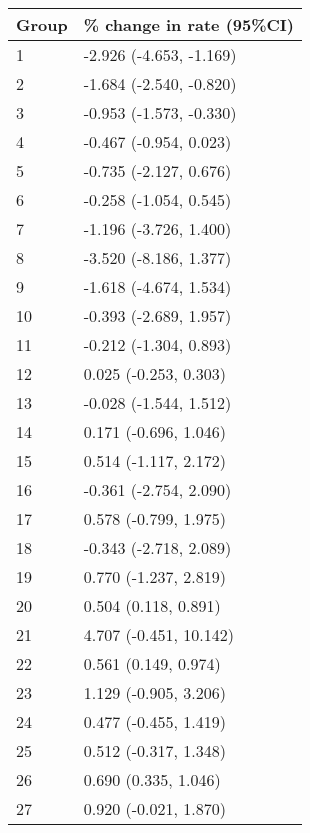 \begin{tabular}{ll}
  \hline
Group & \% change in rate (95\%CI) \\ 
  \hline
   1 & -2.926 (-4.653, -1.169) \\ 
     2 & -1.684 (-2.540, -0.820) \\ 
     3 & -0.953 (-1.573, -0.330) \\ 
     4 & -0.467 (-0.954, 0.023) \\ 
     5 & -0.735 (-2.127, 0.676) \\ 
     6 & -0.258 (-1.054, 0.545) \\ 
     7 & -1.196 (-3.726, 1.400) \\ 
     8 & -3.520 (-8.186, 1.377) \\ 
     9 & -1.618 (-4.674, 1.534) \\ 
    10 & -0.393 (-2.689, 1.957) \\ 
    11 & -0.212 (-1.304, 0.893) \\ 
    12 & 0.025 (-0.253, 0.303) \\ 
    13 & -0.028 (-1.544, 1.512) \\ 
    14 & 0.171 (-0.696, 1.046) \\ 
    15 & 0.514 (-1.117, 2.172) \\ 
    16 & -0.361 (-2.754, 2.090) \\ 
    17 & 0.578 (-0.799, 1.975) \\ 
    18 & -0.343 (-2.718, 2.089) \\ 
    19 & 0.770 (-1.237, 2.819) \\ 
    20 & 0.504 (0.118, 0.891) \\ 
    21 & 4.707 (-0.451, 10.142) \\ 
    22 & 0.561 (0.149, 0.974) \\ 
    23 & 1.129 (-0.905, 3.206) \\ 
    24 & 0.477 (-0.455, 1.419) \\ 
    25 & 0.512 (-0.317, 1.348) \\ 
    26 & 0.690 (0.335, 1.046) \\ 
    27 & 0.920 (-0.021, 1.870) \\ 
   \hline
\end{tabular}

